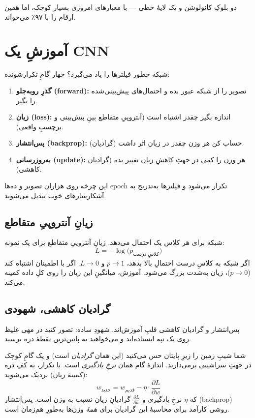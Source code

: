 \documentclass[12pt,a4paper]{article}
\begin{document}
دو بلوکِ کانولوشن و یک لایهٔ خطی — با معیارهای امروزی بسیار کوچک، اما همین ارقام را با ۹۷٪ می‌خواند.

\section{آموزشِ یک CNN}

شبکه چطور فیلترها را یاد می‌گیرد؟ چهار گامِ تکرارشونده:

\begin{enumerate}
  \item \textbf{گذرِ رو‌به‌جلو (forward):} تصویر را از شبکه عبور بده و احتمال‌های پیش‌بینی‌شده را بگیر.
  \item \textbf{زیان (loss):} اندازه بگیر چقدر اشتباه است (آنتروپیِ متقاطع بینِ پیش‌بینی و برچسبِ واقعی).
  \item \textbf{پس‌انتشار (backprop):} حساب کن هر وزن چقدر در زیان اثر داشت (گرادیان).
  \item \textbf{به‌روزرسانی (update):} هر وزن را کمی در جهتِ کاهشِ زیان تغییر بده (گرادیان کاهشی).
\end{enumerate}

این چرخه روی هزاران تصویر و ده‌ها epoch تکرار می‌شود و فیلترها به‌تدریج به آشکارسازهای خوب تبدیل می‌شوند.

\subsection{زیانِ آنتروپیِ متقاطع}

\begin{riyazi}
شبکه برای هر کلاس یک احتمال می‌دهد. زیانِ آنتروپیِ متقاطع برای یک نمونه:
\[
L = -\log\big(p_{\text{کلاسِ درست}}\big)
\]
اگر شبکه به کلاسِ درست احتمالِ بالا بدهد، $p\to1$ و $L\to0$. اگر با اطمینان اشتباه کند ($p\to0$)، زیان به‌شدت بزرگ می‌شود. آموزش، میانگینِ این زیان را روی کلِ داده کمینه می‌کند.
\end{riyazi}

\subsection{گرادیان کاهشی، شهودی}

پس‌انتشار و گرادیان کاهشی قلبِ آموزش‌اند. شهودِ ساده: تصور کنید در مهی غلیظ روی یک تپه ایستاده‌اید و می‌خواهید به پایین‌ترین نقطهٔ دره برسید.

\begin{riyazi}
شما شیبِ زمین را زیرِ پایتان حس می‌کنید (این همان \emph{گرادیان} است) و یک گامِ کوچک در جهتِ سراشیبی برمی‌دارید. اندازهٔ گام همان \emph{نرخِ یادگیری} است. با تکرار، به کفِ دره (کمینهٔ زیان) نزدیک می‌شوید:
\[
w_{\text{جدید}} = w_{\text{قدیم}} - \eta \cdot \frac{\partial L}{\partial w}
\]
که $\eta$ نرخِ یادگیری و $\frac{\partial L}{\partial w}$ گرادیانِ زیان نسبت به وزن است. پس‌انتشار (backprop) روشی کارآمد برای محاسبهٔ این گرادیان برای \emph{همهٔ} وزن‌ها به‌طورِ هم‌زمان است.
\end{riyazi}
\end{document}
